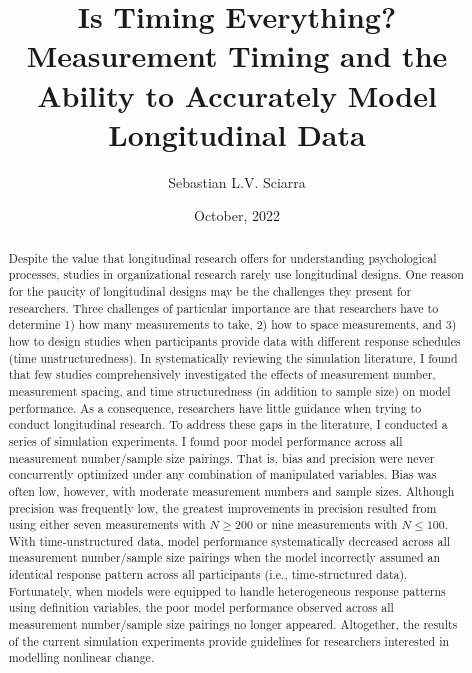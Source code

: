 \documentclass[
12pt, %
twoside,
english]{guelphthesis}
\title{Is Timing Everything? Measurement Timing and the Ability to Accurately Model Longitudinal Data}
\author{Sebastian L.V. Sciarra}
\date{October, 2022}
\let\cleardoublepage\clearpage
\let\oldfrontmatter\frontmatter
\renewcommand{\frontmatter}{
  \oldfrontmatter
     \SetWatermarkLightness{0.8} %
  \SetWatermarkText{DRAFT}
  
  
   \pagestyle{frontmatter} %
}
\begin{document}
\frontmatter %

  \maketitle

\setcounter{page}{2} %

\cleardoublepage
\thispagestyle{empty} %
  \begin{abstract}{2}{Despite the value that longitudinal research offers for understanding psychological processes, studies in organizational research rarely use longitudinal designs. One reason for the paucity of longitudinal designs may be the challenges they present for researchers. Three challenges of particular importance are that researchers have to determine 1) how many measurements to take, 2) how to space measurements, and 3) how to design studies when participants provide data with different response schedules (time unstructuredness). In systematically reviewing the simulation literature, I found that few studies comprehensively investigated the effects of measurement number, measurement spacing, and time structuredness (in addition to sample size) on model performance. As a consequence, researchers have little guidance when trying to conduct longitudinal research. To address these gaps in the literature, I conducted a series of simulation experiments. I found poor model performance across all measurement number/sample size pairings. That is, bias and precision were never concurrently optimized under any combination of manipulated variables. Bias was often low, however, with moderate measurement numbers and sample sizes. Although precision was frequently low, the greatest improvements in precision resulted from using either seven measurements with \(N \ge 200\) or nine measurements with \(N \le 100\). With time-unstructured data, model performance systematically decreased across all measurement number/sample size pairings when the model incorrectly assumed an identical response pattern across all participants (i.e., time-structured data). Fortunately, when models were equipped to handle heterogeneous response patterns using definition variables, the poor model performance observed across all measurement number/sample size pairings no longer appeared. Altogether, the results of the current simulation experiments provide guidelines for researchers interested in modelling nonlinear change.}  %

  \end{abstract}
\end{document}
